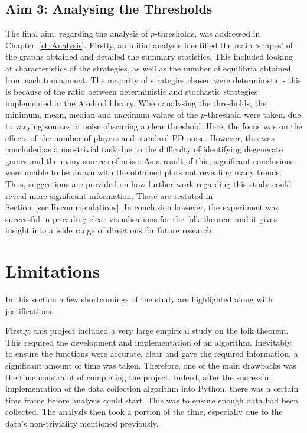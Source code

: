 \subsection{Aim 3: Analysing the Thresholds}\label{subsec:Aim_3_concl}
The final aim, regarding the analysis of \(p\)-thresholds, was addressed in
Chapter~\ref{ch:Analysis}. Firstly, an initial analysis identified the main `shapes' of the graphs obtained and detailed the summary
statistics. This included looking at characteristics of the strategies, as well
as the number of equilibria obtained from each tournament. The majority of
strategies chosen were deterministic - this is because of the ratio between
deterministic and stochastic strategies implemented in the Axelrod library. When
analysing the thresholds, the minimum, mean, median and maximum
values of the \(p\)-threshold were taken, due to varying sources of noise
obscuring a clear threshold. Here, the focus was on the effects of the number
of players and standard PD noise. However, this was
concluded as a non-trivial task due to the difficulty of identifying degenerate
games and the many sources of noise. As a
result of this, significant conclusions were unable to be drawn with the
obtained plots not revealing many trends. Thus, suggestions are
provided on how further work regarding this study could reveal more significant
information. These are restated in Section~\ref{sec:Recommendations}. In
conclusion however, the experiment was successful in providing clear
visualisations for the folk theorem and it gives insight into a wide range of
directions for future research.

\section{Limitations}\label{sec:Limitations}
In this section a few shortcomings of the study are highlighted along
with justifications.

Firstly, this project included a very large empirical study on the folk theorem.
This required the development and implementation of an algorithm.
Inevitably, to ensure the functions were
accurate, clear and gave the required information, a significant amount of time
was taken. Therefore, one of the main
drawbacks was the time constraint of completing the project. Indeed, after the
successful implementation of the data collection algorithm into Python, there
was a certain time frame before analysis could start. This was to ensure enough data had
been collected. The analysis then took a portion of the time,
especially due to the data's non-triviality mentioned previously.

